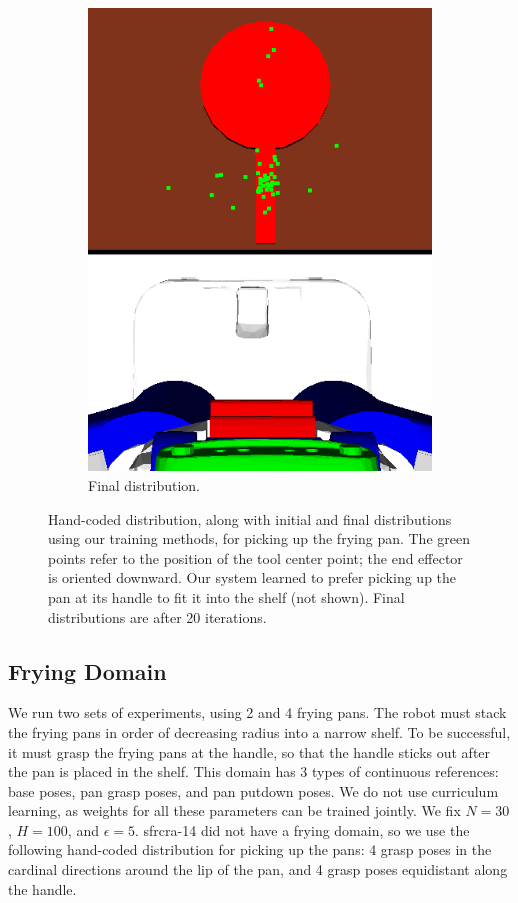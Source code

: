 \begin{figure}[t]
\begin{subfigure}[b]{0.25\linewidth}
    \includegraphics[width=\textwidth]{images/frying_final.png}
    \caption{Final distribution.}
  \end{subfigure}
  \caption{\small{Hand-coded distribution, along with initial and final distributions using our training methods,
for picking up the frying pan. The green points refer to the position of the tool center point; the end
effector is oriented downward. Our system learned to prefer picking up the pan at its handle to fit it into the shelf (not shown). Final distributions are after 20 iterations.}}
  \label{fig:frying}
\end{figure}

\subsection{Frying Domain}
We run two sets of experiments, using 2 and 4 frying pans. The robot must stack the frying pans in order of decreasing
radius into a narrow shelf. To be successful, it must grasp the frying pans at the handle, so that the handle sticks out
after the pan is placed in the shelf. This domain has 3 types of continuous references: base poses, pan grasp poses, and
pan putdown poses. We do not use curriculum learning, as weights for all these parameters can be trained jointly.
We fix $N = 30$, $H = 100$, and $\epsilon = 5$. {\sc sfrcra-14} did not have a frying domain, so we use the following
hand-coded distribution for picking up the pans: 4 grasp poses in the cardinal directions around the lip of the pan,
and 4 grasp poses equidistant along the handle.

